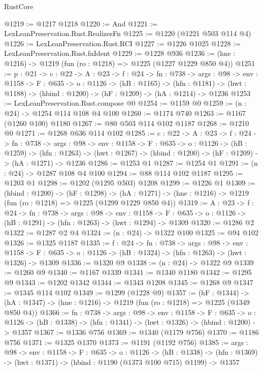 \begin{lexlean}{RustCore}
\begin{coremodule}
@1219 := @1217 @1218
@1220 := And
@1221 := LexLeanPreservation.Rust.RealizesFn
@1225 := @1220 (@1221 @503 @114 @4)
@1226 := LexLeanPreservation.Rust.RCI
@1227 := @1226 @1025
@1228 := LexLeanPreservation.Rust.fnIdent
@1229 := @1228 @936
@1236 := (hne : @1216) -> @1219 (fun (ro : @1218) => @1225 (@1227 @1229 @850 @4))
@1251 := {p : @21} ->
  {c : @22} ->
  {A : @23} ->
  {f : @24} ->
  {fn : @738} ->
  {args : @98} ->
  {env : @1158} ->
  {F : @635} ->
  {o : @1126} ->
  (hB : @1165) ->
  (hfn : @1181) -> (hwt : @1188) -> (hbind : @1200) -> (hF : @1209) -> (hA : @1214) -> @1236
@1253 := LexLeanPreservation.Rust.compose @0
@1254 := @1159 @0
@1259 := (n : @24) -> @1254 @114 @108 @4 @100
@1260 := @1174 @740
@1263 := @1167 (@1260 @100) @1180
@1267 := @80 @503 @114 @102 @1187
@1268 := @1210 @0
@1271 := @1268 @636 @114 @102
@1285 := {c : @22} ->
  {A : @23} ->
  {f : @24} ->
  {fn : @738} ->
  {args : @98} ->
  {env : @1158} ->
  {F : @635} ->
  {o : @1126} ->
  (hB : @1259) ->
  (hfn : @1263) -> (hwt : @1267) -> (hbind : @1200) -> (hF : @1209) -> (hA : @1271) -> @1236
@1286 := @1253 @1
@1287 := @1254 @1
@1291 := (n : @24) -> @1287 @108 @4 @100
@1294 := @88 @114 @102 @1187
@1295 := @1203 @1
@1298 := @1202 (@1295 @503) @1208
@1299 := @1226 @1
@1309 := (hbind : @1200) ->
  (hF : @1298) ->
  (hA : @1271) -> (hne : @1216) -> @1219 (fun (ro : @1218) => @1225 (@1299 @1229 @850 @4))
@1319 := {A : @23} ->
  {f : @24} ->
  {fn : @738} ->
  {args : @98} ->
  {env : @1158} ->
  {F : @635} -> {o : @1126} -> (hB : @1291) -> (hfn : @1263) -> (hwt : @1294) -> @1309
@1320 := @1286 @2
@1322 := @1287 @2 @4
@1324 := (n : @24) -> @1322 @100
@1325 := @94 @102
@1326 := @1325 @1187
@1335 := {f : @24} ->
  {fn : @738} ->
  {args : @98} ->
  {env : @1158} ->
  {F : @635} -> {o : @1126} -> (hB : @1324) -> (hfn : @1263) -> (hwt : @1326) -> @1309
@1336 := @1320 @9
@1338 := (n : @24) -> @1322 @9
@1339 := @1260 @9
@1340 := @1167 @1339
@1341 := @1340 @1180
@1342 := @1295 @9
@1343 := @1202 @1342
@1344 := @1343 @1208
@1345 := @1268 @9
@1347 := @1345 @114 @102
@1349 := @1299 (@1228 @9)
@1357 := (hF : @1344) ->
  (hA : @1347) -> (hne : @1216) -> @1219 (fun (ro : @1218) => @1225 (@1349 @850 @4))
@1366 := {fn : @738} ->
  {args : @98} ->
  {env : @1158} ->
  {F : @635} ->
  {o : @1126} -> (hB : @1338) -> (hfn : @1341) -> (hwt : @1326) -> (hbind : @1200) -> @1357
@1367 := @1336 @756
@1369 := @1340 (@1179 @756)
@1370 := @1186 @756
@1371 := @1325 @1370
@1373 := @1191 (@1192 @756)
@1385 := {args : @98} ->
  {env : @1158} ->
  {F : @635} ->
  {o : @1126} ->
  (hB : @1338) -> (hfn : @1369) -> (hwt : @1371) -> (hbind : @1190 (@1373 @100 @715) @1199) -> @1357

\end{coremodule}
\end{lexlean}
